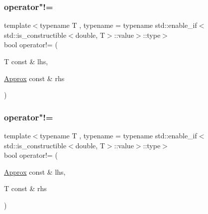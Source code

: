 \subsubsection{\texorpdfstring{operator"!=}{operator!=}\hspace{0.1cm}{\footnotesize\ttfamily [1/2]}}
{\footnotesize\ttfamily template$<$typename T , typename  = typename std\+::enable\+\_\+if$<$std\+::is\+\_\+constructible$<$double, T$>$\+::value$>$\+::type$>$ \\
bool operator!= (\begin{DoxyParamCaption}\item[{T const \&}]{lhs,  }\item[{\mbox{\hyperlink{class_catch_1_1_detail_1_1_approx}{Approx}} const \&}]{rhs }\end{DoxyParamCaption})\hspace{0.3cm}{\ttfamily [friend]}}

\mbox{\label{class_catch_1_1_detail_1_1_approx_a31d62e3c35abb86cf25e02601966ca5d}} 
\subsubsection{\texorpdfstring{operator"!=}{operator!=}\hspace{0.1cm}{\footnotesize\ttfamily [2/2]}}
{\footnotesize\ttfamily template$<$typename T , typename  = typename std\+::enable\+\_\+if$<$std\+::is\+\_\+constructible$<$double, T$>$\+::value$>$\+::type$>$ \\
bool operator!= (\begin{DoxyParamCaption}\item[{\mbox{\hyperlink{class_catch_1_1_detail_1_1_approx}{Approx}} const \&}]{lhs,  }\item[{T const \&}]{rhs }\end{DoxyParamCaption})\hspace{0.3cm}{\ttfamily [friend]}}

\mbox{\label{class_catch_1_1_detail_1_1_approx_a0369de03e81bc2ceaf6c9d830476bd49}} 
